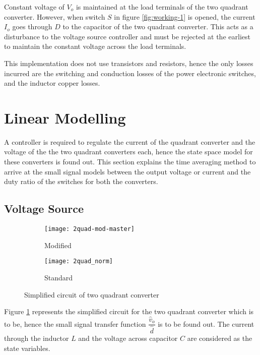 	Constant voltage of $V_o$ is maintained at the load terminals of the two quadrant converter. However, when switch $S$ in figure \ref{fig:working-1} is opened, the current $I_o$ goes through $D$ to the capacitor of the two quadrant converter. This acts as a disturbance to the voltage source controller and must be rejected at the earliest to maintain the constant voltage across the load terminals.

	This implementation does not use transistors and resistors, hence the only losses incurred are the switching and conduction losses of the power electronic switches, and the inductor copper losses.
	
\section{Linear Modelling}
	A controller is required to regulate the current of the quadrant converter and the voltage of the the two quadrant converters each, hence the state space model for these converters is found out. This section explains the time averaging method to arrive at the small signal models between the output voltage or current and the duty ratio of the switches for both the converters.

\subsection{Voltage Source}
	\begin{figure}[H]
		\begin{subfigure}{0.49\textwidth}
			\centering
			\texttt{[image: 2quad-mod-master]}
			\caption{Modified}
			\label{fig:working-4}
		\end{subfigure}
		\begin{subfigure}{0.49\textwidth}
			\centering
			\texttt{[image: 2quad\_norm]}
			\caption{Standard}
			\label{fig:working-4b}
		\end{subfigure}
		\caption{Simplified circuit of two quadrant converter}
		\label{fig:2quad-comparison}
	\end{figure}
	Figure \ref{fig:working-4} represents the simplified circuit for the two quadrant converter which is to be, hence the small signal transfer function $\dfrac{\hat{v}_o}{\hat{d}}$ is to be found out. The current through the inductor $L$ and the voltage across capacitor $C$ are considered as the state variables.

